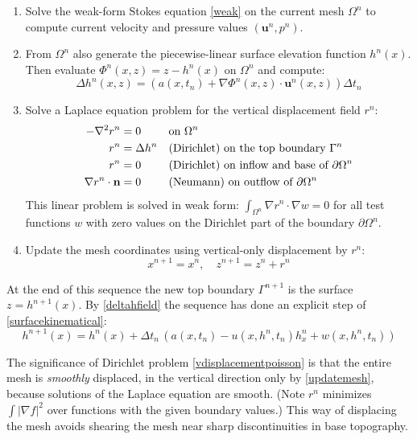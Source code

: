 \documentclass[letterpaper,final,12pt,reqno]{amsart}
\newcommand{\grad}{\nabla}
\newcommand{\bn}{\mathbf{n}}
\newcommand{\bu}{\mathbf{u}}
\begin{document}
\medskip
\renewcommand{\labelenumi}{\emph{\arabic{enumi}.}}
\begin{enumerate}
\item Solve the weak-form Stokes equation \eqref{weak} on the current mesh $\Omega^n$ to compute current velocity and pressure values $(\bu^n,p^n)$.
\item From $\Omega^n$ also generate the piecewise-linear surface elevation function $h^n(x)$.  Then evaluate $\Phi^n(x,z) = z - h^n(x)$ on $\Omega^n$ and compute:
\begin{equation}
\Delta h^n(x,z) =  \left(a(x,t_n) + \grad \Phi^n(x,z)\cdot \bu^n(x,z)\right)\Delta t_n \label{deltahfield}
\end{equation}
\item Solve a Laplace equation problem for the vertical displacement field $r^n$:
\begin{align}
- \grad^2 r^n &= 0 & &\text{on } \Omega^n \label{vdisplacementpoisson} \\
          r^n &= \Delta h^n & &\text{(Dirichlet) on the top boundary } \Gamma^n \notag \\
          r^n &= 0 & &\text{(Dirichlet) on inflow and base of } \partial \Omega^n \notag \\
\grad r^n\cdot \bn &= 0 & &\text{(Neumann) on outflow of } \partial \Omega^n \notag
\end{align}
This linear problem is solved in weak form: $\int_{\Omega^n} \grad r^n\cdot \grad w = 0$ for all test functions $w$ with zero values on the Dirichlet part of the boundary $\partial \Omega^n$.
\item Update the mesh coordinates using vertical-only displacement by $r^n$:
\begin{equation}
  x^{n+1} = x^n, \quad z^{n+1} = z^n + r^n \label{updatemesh}
\end{equation}
\end{enumerate}

\medskip
At the end of this sequence the new top boundary $\Gamma^{n+1}$ is the surface $z=h^{n+1}(x)$.  By \eqref{deltahfield} the sequence has done an explicit step of \eqref{surfacekinematical}:
    $$h^{n+1}(x) = h^n(x) + \Delta t_n\,\left(a(x,t_n) - u(x,h^n,t_n) h_x^n + w(x,h^n,t_n)\right)$$

The significance of Dirichlet problem \eqref{vdisplacementpoisson} is that the entire mesh is \emph{smoothly} displaced, in the vertical direction only by \eqref{updatemesh}, because solutions of the Laplace equation are smooth.  (Note $r^n$ minimizes $\int |\grad f|^2$ over functions with the given boundary values.)  This way of displacing the mesh avoids shearing the mesh near sharp discontinuities in base topography.
\end{document}
